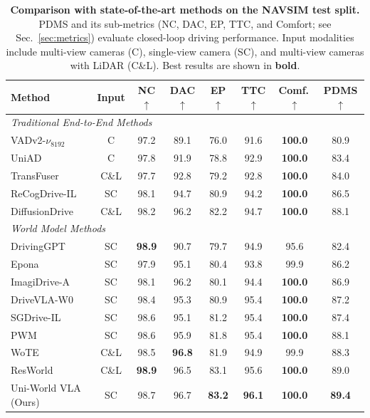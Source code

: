 \documentclass[runningheads]{llncs}
\begin{document}
\begin{table}[h]
\centering
\small
\setlength{\tabcolsep}{4pt}
\caption{\textbf{Comparison with state-of-the-art methods on the NAVSIM test split.} 
PDMS and its sub-metrics (NC, DAC, EP, TTC, and Comfort; see Sec.~\ref{sec:metrics}) evaluate closed-loop driving performance. 
Input modalities include multi-view cameras (C), single-view camera (SC), and multi-view cameras with LiDAR (C\&L). 
Best results are shown in \textbf{bold}.}
\begin{tabular}{l|c|ccccc|>{\columncolor{gray!20}}c}
\toprule
Method & Input & NC $\uparrow$ & DAC $\uparrow$ & EP $\uparrow$ & TTC $\uparrow$ & Comf.\,$\uparrow$ & PDMS $\uparrow$ \\
\midrule
\multicolumn{8}{l}{\textit{Traditional End-to-End Methods}} \\
VADv2-$\nu_{8192}$~\cite{chen2024vadv2} & C & 97.2 & 89.1 & 76.0 & 91.6 & \textbf{100.0} & 80.9 \\
UniAD~\cite{hu2023planningorientedautonomousdriving} & C & 97.8 & 91.9 & 78.8 & 92.9 & \textbf{100.0} & 83.4 \\
TransFuser~\cite{chitta2023transfuser} & C\&L & 97.7 & 92.8 & 79.2 & 92.8 & \textbf{100.0} & 84.0 \\
ReCogDrive-IL~\cite{li2025recogdrive} & SC & 98.1 & 94.7 & 80.9 & 94.2 & \textbf{100.0} & 86.5\\
DiffusionDrive~\cite{liao2025diffusiondrive} & C\&L & 98.2 & 96.2 & 82.2 & 94.7 & \textbf{100.0} & 88.1 \\
\midrule
\multicolumn{8}{l}{\textit{World Model Methods}} \\
DrivingGPT~\cite{chen2024drivinggpt} & SC & \textbf{98.9} & 90.7 & 79.7 & 94.9 & 95.6 & 82.4 \\
Epona~\cite{zhang2025epona} & SC & 97.9 & 95.1 & 80.4 & 93.8 & 99.9 & 86.2 \\
ImagiDrive-A~\cite{li2025imagidrive} & SC & 98.1 & 96.2 & 80.1 & 94.4 & \textbf{100.0} & 86.9 \\
DriveVLA-W0~\cite{li2025drivevla} & SC & 98.4 & 95.3 & 80.9 & 95.4 & \textbf{100.0} & 87.2 \\
SGDrive-IL~\cite{li2026sgdrive} & SC & 98.6 & 95.1 & 81.2 & 95.4 & \textbf{100.0} & 87.4 \\
PWM~\cite{zhao2025pwm} & SC & 98.6 & 95.9 & 81.8 & 95.4 & \textbf{100.0} & 88.1 \\
WoTE~\cite{li2025wote} & C\&L & 98.5 & \textbf{96.8} & 81.9 & 94.9 & 99.9 & 88.3 \\
ResWorld~\cite{zhang2026resworld} & C\&L & \textbf{98.9} & 96.5 & 83.1 & 95.6 & \textbf{100.0} & 89.0 \\
Uni-World VLA (Ours) & SC & 98.7 & 96.7 & \textbf{83.2} & \textbf{96.1} & \textbf{100.0} & \textbf{89.4} \\
\bottomrule
\end{tabular}
\label{tab:navsim_pdms}
\end{table}
\end{document}
